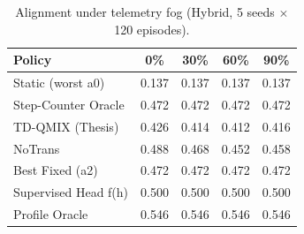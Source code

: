 \begin{table}[t]\centering
\caption{Alignment under telemetry fog (Hybrid, 5 seeds $\times$ 120 episodes).}
\label{tab:fog}
\begin{tabular}{l c c c c}
\hline
Policy & 0\% & 30\% & 60\% & 90\% \\
\hline
Static (worst a0) & 0.137 & 0.137 & 0.137 & 0.137 \\
Step-Counter Oracle & 0.472 & 0.472 & 0.472 & 0.472 \\
TD-QMIX (Thesis) & 0.426 & 0.414 & 0.412 & 0.416 \\
NoTrans & 0.488 & 0.468 & 0.452 & 0.458 \\
Best Fixed (a2) & 0.472 & 0.472 & 0.472 & 0.472 \\
Supervised Head f(h) & 0.500 & 0.500 & 0.500 & 0.500 \\
Profile Oracle & 0.546 & 0.546 & 0.546 & 0.546 \\
\hline
\end{tabular}
\end{table}